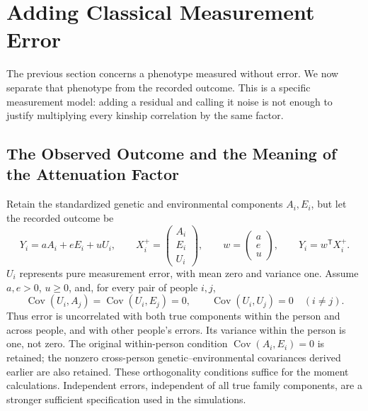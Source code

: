 \section{Adding Classical Measurement Error}
\label{sec:measurement-error}

The previous section concerns a phenotype measured without error. We now
separate that phenotype from the recorded outcome. This is a specific
measurement model: adding a residual and calling it noise is not enough
to justify multiplying every kinship correlation by the same factor.

\subsection{The Observed Outcome and the Meaning of the Attenuation Factor}

Retain the standardized genetic and environmental components $A_i,E_i$,
but let the recorded outcome be
\begin{equation}
 Y_i=aA_i+eE_i+uU_i,\qquad
 X_i^+=\begin{pmatrix}A_i\\E_i\\U_i\end{pmatrix},\qquad
 w=\begin{pmatrix}a\\e\\u\end{pmatrix},\qquad Y_i=w^{\mathsf T}X_i^+.
 \label{eq:me-outcome}
\end{equation}
$U_i$ represents pure measurement error, with mean zero and variance
one. Assume $a,e>0$, $u\geq0$, and, for every pair of people $i,j$,
\begin{equation}
 \operatorname{Cov}(U_i,A_j)=\operatorname{Cov}(U_i,E_j)=0,\qquad
 \operatorname{Cov}(U_i,U_j)=0\quad(i\ne j).
 \label{eq:me-orthogonality}
\end{equation}
Thus error is uncorrelated with both true components within the person
and across people, and with other people's errors. Its variance within
the person is one, not zero. The original within-person condition
$\operatorname{Cov}(A_i,E_i)=0$ is retained; the nonzero cross-person
genetic--environmental covariances derived earlier are also retained.
These orthogonality conditions suffice for the moment calculations.
Independent errors, independent of all true family components, are a
stronger sufficient specification used in the simulations.

